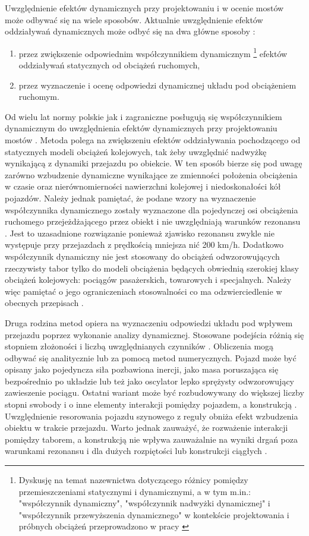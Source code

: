 Uwzględnienie efektów dynamicznych przy projektowaniu i w ocenie mostów może odbywać się na wiele sposobów. Aktualnie uwzględnienie efektów oddziaływań dynamicznych może odbyć się na dwa główne sposoby \parencite{Goicolea2008a}:
\begin{enumerate}
	\item przez zwiększenie odpowiednim współczynnikiem dynamicznym
	\footnote{Dyskusję na temat nazewnictwa dotyczącego różnicy pomiędzy przemieszczeniami statycznymi i dynamicznymi, a w tym m.in.: "współczynnik dynamiczny", "współczynnik nadwyżki dynamicznej" i "współczynnik przewyższenia dynamicznego" w kontekście projektowania i próbnych obciążeń przeprowadzono w pracy \parencite{Poprawa2018}} 
	efektów oddziaływań statycznych od obciążeń ruchomych,
	\item przez wyznaczenie i ocenę odpowiedzi dynamicznej układu pod obciążeniem ruchomym.
\end{enumerate}

Od wielu lat normy polskie jak i zagraniczne posługują się współczynnikiem dynamicznym do uwzględnienia efektów dynamicznych przy projektowaniu mostów \parencite{Karas2011}. Metoda polega na zwiększeniu efektów oddziaływania pochodzącego od statycznych modeli obciążeń kolejowych, tak żeby uwzględnić nadwyżkę wynikającą z dynamiki przejazdu po obiekcie. W ten sposób bierze się pod uwagę zarówno wzbudzenie dynamiczne wynikające ze zmienności położenia obciążenia w czasie oraz nierównomierności nawierzchni kolejowej i niedoskonałości kół pojazdów. Należy jednak pamiętać, że podane wzory na wyznaczenie współczynnika dynamicznego zostały wyznaczone dla pojedynczej osi obciążenia ruchomego przejeżdżającego przez obiekt i nie uwzględniają warunków rezonansu \parencite{Goicolea2008}. Jest to uzasadnione rozwiązanie ponieważ zjawisko rezonansu zwykle nie występuje przy przejazdach z prędkością mniejsza nić 200 km/h. Dodatkowo współczynnik dynamiczny nie jest stosowany do obciążeń odwzorowujących rzeczywisty tabor tylko do modeli obciążenia będących obwiednią szerokiej klasy obciążeń kolejowych: pociągów pasażerskich, towarowych i specjalnych. Należy więc pamiętać o jego ograniczeniach stosowalności co ma odzwierciedlenie w obecnych przepisach \parencite{PKNj}.

Druga rodzina metod opiera na wyznaczeniu odpowiedzi układu pod wpływem przejazdu poprzez wykonanie analizy dynamicznej. Stosowane podejścia różnią się stopniem złożoności i liczbą uwzględnianych czynników \parencite{Goicolea2008a}. Obliczenia mogą odbywać się analitycznie lub za pomocą metod numerycznych. Pojazd może być opisany jako pojedyncza siła pozbawiona inercji, jako masa poruszająca się bezpośrednio po układzie lub też jako oscylator lepko sprężysty odwzorowujący zawieszenie pociągu. Ostatni wariant może być rozbudowywany do większej liczby stopni swobody i o inne elementy interakcji pomiędzy pojazdem, a konstrukcją \parencite{Calcada2008,Szafranski2013,Szafranski2021}. Uwzględnienie resorowania pojazdu szynowego z reguły obniża efekt wzbudzenia obiektu w trakcie przejazdu. Warto jednak zauważyć, że rozważenie interakcji pomiędzy taborem, a konstrukcją nie wpływa zauważalnie na wyniki drgań poza warunkami rezonansu i dla dużych rozpiętości lub konstrukcji ciągłych \parencite{Goicolea2008a}.

